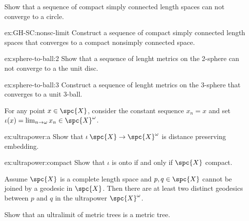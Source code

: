 
\vskip 50mm

\noindent \begin{subthm}{}
Show that a sequence of compact simply connected length spaces can not converge to a circle.
\end{subthm}

\begin{subthm}{ex:GH-SC:nonsc-limit}
Construct a sequence of compact simply connected length spaces that converges to a compact nonsimply connected space.
\end{subthm}


\vskip 50mm

\noindent \begin{subthm}{ex:sphere-to-ball:2}
Show that a sequence of lenght metrics on the 2-sphere can not converge to a the unit disc.
\end{subthm}

\begin{subthm}{ex:sphere-to-ball:3}
Construct a sequence of lenght metrics on the 3-sphere that converges to a unit 3-ball.
\end{subthm}


\newpage
\pagestyle{empty}

\noindent For any point $x\in \spc{X}$, consider the constant sequence $x_n=x$
and set $\iota(x)=\lim_{n\to\omega}x_n\in\spc{X}^\omega$.

\begin{subthm}{ex:ultrapower:a}
Show that $\iota\:\spc{X}\to\spc{X}^\omega$ is distance preserving embedding.
\end{subthm}

\begin{subthm}{ex:ultrapower:compact} 
Show that $\iota$ is onto if and only if $\spc{X}$ compact.
\end{subthm}



\vskip 50mm

\noindent Assume $\spc{X}$ is a complete length space 
and $p,q\in\spc{X}$ cannot be joined by a geodesic in $\spc{X}$.  
Then there are at least two distinct geodesics between $p$ and $q$ 
in the ultrapower $\spc{X}^\omega$.

\vskip 50mm

\noindent Show that an ultralimit of metric trees is a metric tree. 

